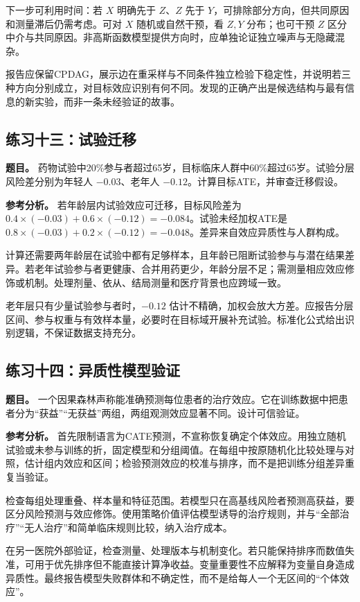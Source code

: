 下一步可利用时间：若 $X$ 明确先于 $Z$、$Z$ 先于 $Y$，可排除部分方向，但共同原因和测量滞后仍需考虑。可对 $X$ 随机或自然干预，看 $Z,Y$ 分布；也可干预 $Z$ 区分中介与共同原因。非高斯函数模型提供方向时，应单独论证独立噪声与无隐藏混杂。

报告应保留CPDAG，展示边在重采样与不同条件独立检验下稳定性，并说明若三种方向分别成立，对目标效应识别有何不同。发现的正确产出是候选结构与最有信息的新实验，而非一条未经验证的故事。

\subsection*{练习十三：试验迁移}

\textbf{题目。} 药物试验中20\%参与者超过65岁，目标临床人群中60\%超过65岁。试验分层风险差分别为年轻人 $-0.03$、老年人 $-0.12$。计算目标ATE，并审查迁移假设。

\textbf{参考分析。} 若年龄层内试验效应可迁移，目标风险差为 $0.4\times(-0.03)+0.6\times(-0.12)=-0.084$。试验未经加权ATE是 $0.8\times(-0.03)+0.2\times(-0.12)=-0.048$。差异来自效应异质性与人群构成。

计算还需要两年龄层在试验中都有足够样本，且年龄已阻断试验参与与潜在结果差异。若老年试验参与者更健康、合并用药更少，年龄分层不足；需测量相应效应修饰或机制。处理剂量、依从、结局测量和医疗背景也应跨域一致。

老年层只有少量试验参与者时，$-0.12$ 估计不精确，加权会放大方差。应报告分层区间、参与权重与有效样本量，必要时在目标域开展补充试验。标准化公式给出识别逻辑，不保证数据支持充分。

\subsection*{练习十四：异质性模型验证}

\textbf{题目。} 一个因果森林声称能准确预测每位患者的治疗效应。它在训练数据中把患者分为“获益”“无获益”两组，两组观测效应显著不同。设计可信验证。

\textbf{参考分析。} 首先限制语言为CATE预测，不宣称恢复确定个体效应。用独立随机试验或未参与训练的折，固定模型和分组阈值。在每组中按原随机化比较处理与对照，估计组内效应和区间；检验预测效应的校准与排序，而不是把训练分组差异重复当验证。

检查每组处理重叠、样本量和特征范围。若模型只在高基线风险者预测高获益，要区分风险预测与效应修饰。使用策略价值评估模型诱导的治疗规则，并与“全部治疗”“无人治疗”和简单临床规则比较，纳入治疗成本。

在另一医院外部验证，检查测量、处理版本与机制变化。若只能保持排序而数值失准，可用于优先排序但不能直接计算净收益。变量重要性不应解释为变量自身造成异质性。最终报告模型失败群体和不确定性，而不是给每人一个无区间的“个体效应”。

